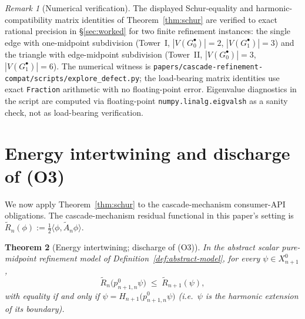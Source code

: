 \documentclass[11pt]{article}
\theoremstyle{plain}
\newtheorem{theorem}{Theorem}[section]
\theoremstyle{definition}
\theoremstyle{remark}
\newtheorem{remark}[theorem]{Remark}
\begin{document}
\begin{remark}[Numerical verification]\label{rem:numerics}
The displayed Schur-equality and harmonic-compatibility matrix
identities of Theorem~\ref{thm:schur} are verified to exact rational
precision in \S\ref{sec:worked} for two finite refinement instances:
the single edge with one-midpoint subdivision (Tower~I,
$|V(G_0^{\bullet})| = 2$, $|V(G_1^{\bullet})| = 3$) and the triangle
with edge-midpoint subdivision (Tower~II,
$|V(G_0^{\bullet})| = 3$, $|V(G_1^{\bullet})| = 6$). The numerical
witness is
\texttt{papers/cascade-refinement-compat/scripts/explore\_defect.py};
the load-bearing matrix identities use exact \texttt{Fraction}
arithmetic with no floating-point error. Eigenvalue diagnostics in
the script are computed via floating-point
\texttt{numpy.linalg.eigvalsh} as a sanity check, not as load-bearing
verification.
\end{remark}

\section{Energy intertwining and discharge of (O3)}\label{sec:O3}

We now apply Theorem~\ref{thm:schur} to the cascade-mechanism
consumer-API obligations. The cascade-mechanism residual functional
in this paper's setting is
$\widetilde R_n(\phi) := \tfrac12 \langle \phi, \widetilde A_n \phi\rangle$.

\begin{theorem}[Energy intertwining; discharge of (O3)]\label{thm:O3-discharge}
In the abstract scalar pure-midpoint refinement model of
Definition~\ref{def:abstract-model}, for every
$\psi \in X_{n+1}^{0}$,
\begin{equation}\label{eq:O3}
   \widetilde R_n\bigl(p^{0}_{n+1, n} \psi\bigr)
   \;\le\;
   \widetilde R_{n+1}(\psi),
\end{equation}
with equality if and only if $\psi = H_{n+1}\bigl(p^{0}_{n+1, n} \psi\bigr)$
(i.e.\ $\psi$ is the harmonic extension of its boundary).
\end{theorem}
\end{document}
